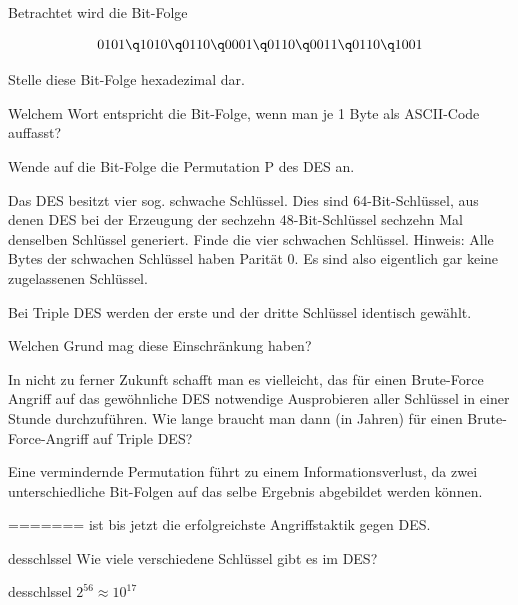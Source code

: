 \documentclass[%
<<<<<<< Updated upstream
11pt,%
twoside,%
titlepage,%
german,%
headsepline%
]{scrartcl}
\begin{document}
\begin{cdef}[Linksverschiebung]{}
\begin{cdef}{}
\begin{ueb}
Betrachtet wird die Bit-Folge

$$0101\q 1010\q 0110\q 0001\q 0110\q 0011\q 0110\q 1001$$

\begin{enumeratea}
\item Stelle diese Bit-Folge hexadezimal dar. 
\item Welchem Wort entspricht die Bit-Folge, wenn man je 1 Byte als ASCII-Code auffasst? 
\item Wende auf die Bit-Folge die  Permutation P des DES an.
\end{enumeratea}
\end{ueb}

\begin{ueb}
Das DES besitzt vier sog. \glqq schwache Schlüssel\grqq. Dies sind 64-Bit-Schlüssel, aus denen DES bei der Erzeugung der sechzehn 48-Bit-Schlüssel sechzehn Mal denselben Schlüssel generiert. 
Finde die vier schwachen Schlüssel. 
Hinweis: Alle Bytes der schwachen Schlüssel haben Parität 0. Es sind also eigentlich gar keine zugelassenen Schlüssel.
\end{ueb}

\begin{ueb}
Bei Triple DES werden der erste und der dritte Schlüssel identisch gewählt.
\begin{enumeratea} 
\item Welchen Grund mag diese Einschränkung haben? 
\item In nicht zu ferner Zukunft schafft man es vielleicht, das für einen Brute-Force Angriff auf das gewöhnliche DES notwendige Ausprobieren aller  Schlüssel in einer Stunde durchzuführen. 
Wie lange braucht man dann (in Jahren) für einen Brute-Force-Angriff auf Triple DES?
\end{enumeratea}
\end{ueb}

\begin{ueb}
Eine vermindernde Permutation führt zu einem Informationsverlust, da zwei unterschiedliche Bit-Folgen auf das selbe Ergebnis abgebildet werden k\"onnen.
\begin{enumeratea}
=======
 ist bis jetzt die erfolgreichste Angriffstaktik gegen DES.

\begin{uebenv}{desschlssel}
Wie viele verschiedene Schlüssel gibt es im DES?
\end{uebenv}

\begin{lsg}{desschlssel}
    $2^{56}\approx10^{17}$
\end{lsg}


\end{enumeratea}
\end{ueb}
\end{cdef}
\end{cdef}
\end{document}
